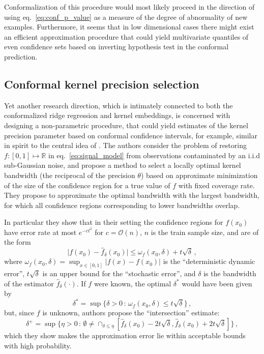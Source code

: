 \documentclass[a4paper,14pt]{extarticle}
\newcommand{\Real}{\mathbb{R}}
\begin{document}
Conformalization of this procedure would most likely proceed in the direction of
using eq.~\ref{eq:conf_p_value} as a measure of the degree of abnormality of new
examples. Furthermore, it seems that in low dimensional cases there might exist an
efficient approximation procedure that could yield multivariate quantiles of even
confidence sets based on inverting hypothesis test in the conformal prediction.


\subsection{Conformal kernel precision selection} %
\label{sub:conformal_kernel_precision_selection}

Yet another research direction, which is intimately connected to both the conformalized
ridge regression and kernel embeddings, is concerned with designing a non-parametric
procedure, that could yield estimates of the kernel precision parameter based on
conformal confidence intervals, for example, similar in spirit to the central idea
of \cite{goldenshluger1997}. The authors consider the problem of restoring $f:[0,1]
\mapsto\Real$ in eq.~\ref{eq:signal_model} from observations contaminated by an i.i.d
sub-Gaussian noise, and propose a method to select a locally optimal kernel bandwidth
(the reciprocal of the precision $\theta$) based on approximate minimization of the
size of the confidence region for a true value of $f$ with fixed coverage rate. They
propose to approximate the optimal bandwidth with the largest bandwidth, for which
all confidence regions corresponding to lower bandwidths overlap.

In particular they show that in their setting the confidence regions for $f(x_0)$
have error rate at most $e^{- c t^2}$ for $c = \mathcal{O}(n)$, $n$ is the train
sample size, and are of the form
\begin{equation*}
  \bigl| f(x_0) - \hat{f}_\delta(x_0) \bigr|
    \leq \omega_f(x_0, \delta) + t \sqrt{\delta} \,,
\end{equation*}
where $\omega_f(x_0, \delta) = \sup_{x\in[0,1]} |f(x)-f(x_0)|$ is the ``deterministic
dynamic error'', $t \sqrt{\delta}$ is an upper bound for the ``stochastic error'',
and $\delta$ is the bandwidth of the estimator $\hat{f}_\delta(\cdot)$. If $f$ were
known, the optimal $\delta^*$ would have been given by
\begin{equation*}
  \delta^*
    = \sup\bigl\{ \delta > 0 \, : \,
        \omega_f(x_0, \delta) \leq t \sqrt{\delta} \bigr\}\,,
\end{equation*}
but, since $f$ is unknown, authors propose the ``intersection'' estimate:
\begin{equation*}
  \delta^+
    = \sup\{ \eta > 0 \, : \, \emptyset \neq 
        \cap_{\delta\leq \eta} [\hat{f}_\delta(x_0) - 2 t \sqrt{\delta},
                                \hat{f}_\delta(x_0) + 2 t \sqrt{\delta}] \} \,,
\end{equation*}
which they show makes the approximation error lie within acceptable bounds with high
probability.
\end{document}
